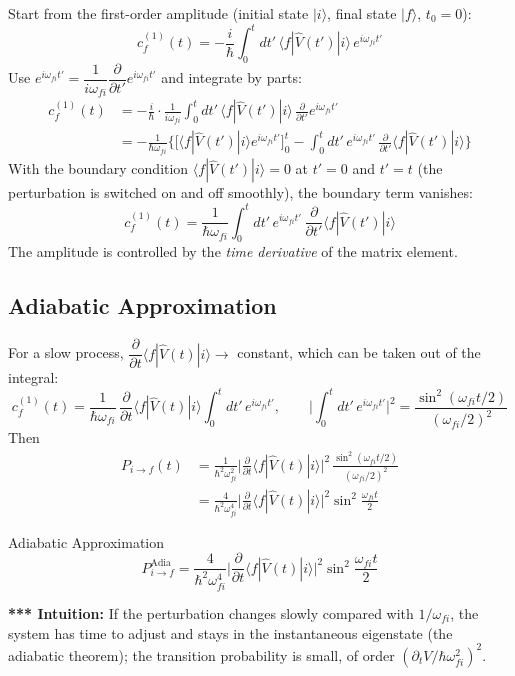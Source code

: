 \documentclass[11pt,a4paper]{article}
\begin{document}
Start from the first-order amplitude (initial state $|i\rangle$, final state $|f\rangle$, $t_0=0$):
\[
c_f^{(1)}(t)=-\frac i\hbar\int_0^tdt'\,\langle f|\hat V(t')|i\rangle\,e^{i\omega_{fi}t'}
\]
Use $e^{i\omega_{fi}t'}=\dfrac1{i\omega_{fi}}\dfrac\partial{\partial t'}e^{i\omega_{fi}t'}$ and integrate by parts:
\begin{align*}
c_f^{(1)}(t)&=-\frac i\hbar\cdot\frac1{i\omega_{fi}}\int_0^tdt'\,\langle f|\hat V(t')|i\rangle\,\frac\partial{\partial t'}e^{i\omega_{fi}t'}\\
&=-\frac1{\hbar\omega_{fi}}\Big\{\big[\langle f|\hat V(t')|i\rangle e^{i\omega_{fi}t'}\big]_0^t-\int_0^tdt'\,e^{i\omega_{fi}t'}\,\frac\partial{\partial t'}\langle f|\hat V(t')|i\rangle\Big\}
\end{align*}
With the boundary condition $\langle f|\hat V(t')|i\rangle=0$ at $t'=0$ and $t'=t$ (the perturbation is switched on and off smoothly), the boundary term vanishes:
\[
c_f^{(1)}(t)=\frac1{\hbar\omega_{fi}}\int_0^tdt'\,e^{i\omega_{fi}t'}\,\frac\partial{\partial t'}\langle f|\hat V(t')|i\rangle
\]
The amplitude is controlled by the \textit{time derivative} of the matrix element.

\subsection{Adiabatic Approximation}
For a slow process, $\dfrac\partial{\partial t}\langle f|\hat V(t)|i\rangle\to$ constant, which can be taken out of the integral:
\[
c_f^{(1)}(t)=\frac1{\hbar\omega_{fi}}\,\frac\partial{\partial t}\langle f|\hat V(t)|i\rangle\int_0^tdt'\,e^{i\omega_{fi}t'},\qquad
\Big|\int_0^tdt'\,e^{i\omega_{fi}t'}\Big|^2=\frac{\sin^2(\omega_{fi}t/2)}{(\omega_{fi}/2)^2}
\]
Then
\begin{align*}
P_{i\to f}(t)&=\frac1{\hbar^2\omega_{fi}^2}\Big|\frac\partial{\partial t}\langle f|\hat V(t)|i\rangle\Big|^2\,\frac{\sin^2(\omega_{fi}t/2)}{(\omega_{fi}/2)^2}\\
&=\frac4{\hbar^2\omega_{fi}^4}\Big|\frac\partial{\partial t}\langle f|\hat V(t)|i\rangle\Big|^2\sin^2\frac{\omega_{fi}t}2
\end{align*}
\begin{thm}{Adiabatic Approximation}
\[
P_{i\to f}^{\text{Adia}}=\frac4{\hbar^2\omega_{fi}^4}\Big|\frac\partial{\partial t}\langle f|\hat V(t)|i\rangle\Big|^2\sin^2\frac{\omega_{fi}t}2
\]
\end{thm}

\textbf{*** Intuition:} If the perturbation changes slowly compared with $1/\omega_{fi}$, the system has time to adjust and stays in the instantaneous eigenstate (the adiabatic theorem); the transition probability is small, of order $(\partial_tV/\hbar\omega_{fi}^2)^2$.
\end{document}
